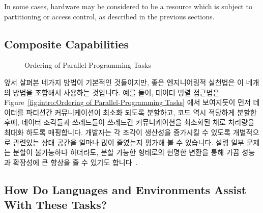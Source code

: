 In some cases, hardware may be considered to be a resource which
is subject to partitioning or access control, as described in
the previous sections.
\fi

\subsection{Composite Capabilities}
\label{sec:Composite Capabilities}

\begin{figure}[tb]
\centering
{}
\caption{Ordering of Parallel-Programming Tasks}
\label{fig:intro:Ordering of Parallel-Programming Tasks}
\end{figure}

앞서 살펴본 네가지 방법이 기본적인 것들이지만, 좋은 엔지니어링적 실천법은 이
네개의 방법을 조합해서 사용하는 것입니다.
예를 들어, 데이터 병렬 접근법은 Figure~\ref{fig:intro:Ordering of
Parallel-Programming Tasks} 에서 보여지듯이 먼저 데이터를 파티션간
커뮤니케이션이 최소화 되도록 분할하고, 코드 역시 적당하게 분할한 후에, 데이터
조각들과 쓰레드들이 쓰레드간 커뮤니케이션을 최소화된 채로 처리량을 최대화
하도록 매핑합니다.
개발자는 각 조각이 생산성을 증가시킬 수 있도록 개별적으로 관련있는 상태 공간을
얼마나 많이 줄였는지 평가해 볼 수 있습니다.
설령 일부 문제는 분할이 불가능하다 하더라도, 분할 가능한 형태로의 현명한 변환을
통해 가끔 성능과 확장성에 큰 향상을 줄 수 있기도
합니다~\cite{PanagiotisMetaxas1999PDCS}.

\subsection{How Do Languages and Environments Assist With These Tasks?}
\label{sec:intro:How Do Languages and Environments Assist With These Tasks?}

